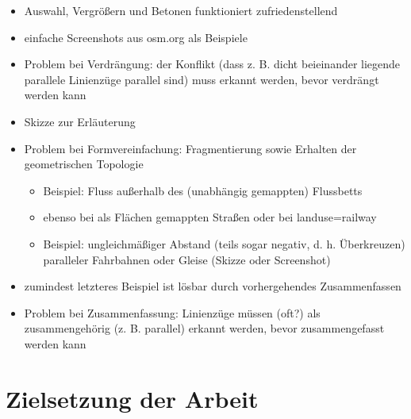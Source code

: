 \documentclass{../thesis}
\begin{document}
\begin{itemize}
	
	\item Auswahl, Vergrößern und Betonen funktioniert zufriedenstellend
		\item einfache Screenshots aus osm.org als Beispiele
	
	\item Problem bei Verdrängung: der Konflikt (dass z. B. dicht beieinander liegende parallele Linienzüge parallel sind) muss erkannt werden, bevor verdrängt werden kann
		\item Skizze zur Erläuterung
	
	\item Problem bei Formvereinfachung: Fragmentierung sowie Erhalten der geometrischen Topologie
	\begin{itemize}
		\item Beispiel: Fluss außerhalb des (unabhängig gemappten) Flussbetts \cite{Kla11 57}
			\item ebenso bei als Flächen gemappten Straßen oder bei landuse=railway
		\item Beispiel: ungleichmäßiger Abstand (teils sogar negativ, d. h. Überkreuzen) paralleler Fahrbahnen oder Gleise (Skizze oder Screenshot)
	\end{itemize}
	
	\item zumindest letzteres Beispiel ist lösbar durch vorhergehendes Zusammenfassen
	
	\item Problem bei Zusammenfassung: Linienzüge müssen (oft?) als zusammengehörig (z. B. parallel) erkannt werden, bevor zusammengefasst werden kann
	
	
\end{itemize}


\section{Zielsetzung der Arbeit}


\end{document}
